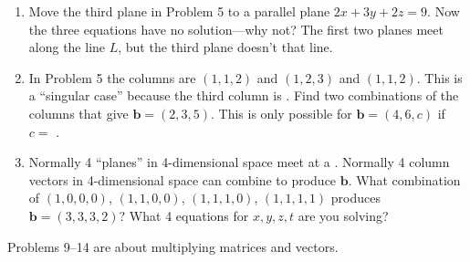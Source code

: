 \documentclass[14pt, a4paper]{article}
\begin{document}
\begin{enumerate}
    \item Move the third plane in Problem 5 to a parallel plane $2x + 3y + 2z = 9$. Now the three equations have no solution—why not? The first two planes meet along the line $L$, but the third plane doesn’t \underline{\hspace{3cm}} that line.

    \item In Problem 5 the columns are $(1,1,2)$ and $(1,2,3)$ and $(1,1,2)$. This is a ``singular case'' because the third column is \underline{\hspace{3cm}}. Find two combinations of the columns that give $\boldsymbol{b} = (2,3,5)$. This is only possible for $\boldsymbol{b} = (4,6,c)$ if $c = $ \underline{\hspace{2cm}}.

    \item Normally 4 ``planes'' in 4-dimensional space meet at a \underline{\hspace{3cm}}. Normally 4 column vectors in 4-dimensional space can combine to produce $\boldsymbol{b}$. What combination of $(1,0,0,0)$, $(1,1,0,0)$, $(1,1,1,0)$, $(1,1,1,1)$ produces $\boldsymbol{b} = (3,3,3,2)$? What 4 equations for $x, y, z, t$ are you solving?

\end{enumerate}

\noindent Problems 9--14 are about multiplying matrices and vectors.
\end{document}
